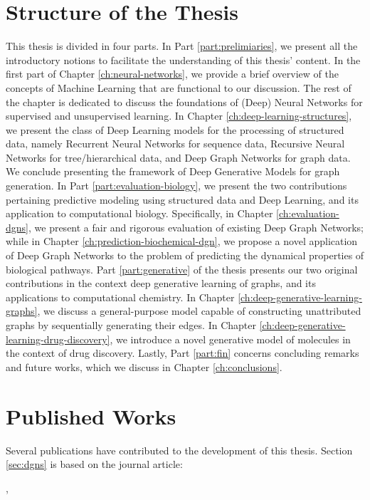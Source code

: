 \section{Structure of the Thesis}
This thesis is divided in four parts. In Part \ref{part:prelimiaries}, we present all the introductory notions to facilitate the understanding of this thesis' content. In the first part of Chapter \ref{ch:neural-networks}, we provide a brief overview of the concepts of Machine Learning that are functional to our discussion. The rest of the chapter is dedicated to discuss the foundations of (Deep) Neural Networks for supervised and unsupervised learning. In Chapter \ref{ch:deep-learning-structures}, we present the class of Deep Learning models for the processing of structured data, namely Recurrent Neural Networks for sequence data, Recursive Neural Networks for tree/hierarchical data, and Deep Graph Networks for graph data. We conclude presenting the framework of Deep Generative Models for graph generation. In Part \ref{part:evaluation-biology}, we present the two contributions pertaining predictive modeling using structured data and Deep Learning, and its application to computational biology. Specifically, in Chapter \ref{ch:evaluation-dgns}, we present a fair and rigorous evaluation of existing Deep Graph Networks; while in Chapter \ref{ch:prediction-biochemical-dgn}, we propose a novel application of Deep Graph Networks to the problem of predicting the dynamical properties of biological pathways. Part \ref{part:generative} of the thesis presents our two original contributions in the context deep generative learning of graphs, and its applications to computational chemistry. In Chapter \ref{ch:deep-generative-learning-graphs}, we discuss a general-purpose  model capable of constructing unattributed graphs by sequentially generating their edges. In Chapter \ref{ch:deep-generative-learning-drug-discovery}, we introduce a novel generative model of molecules in the context of drug discovery. Lastly, Part \ref{part:fin} concerns concluding remarks and future works, which we discuss in Chapter \ref{ch:conclusions}.

\section{Published Works}
Several publications have contributed to the development of this thesis. Section \ref{sec:dgns} is based on the journal article:

\vspace{1em}
,
\vspace{1em}

